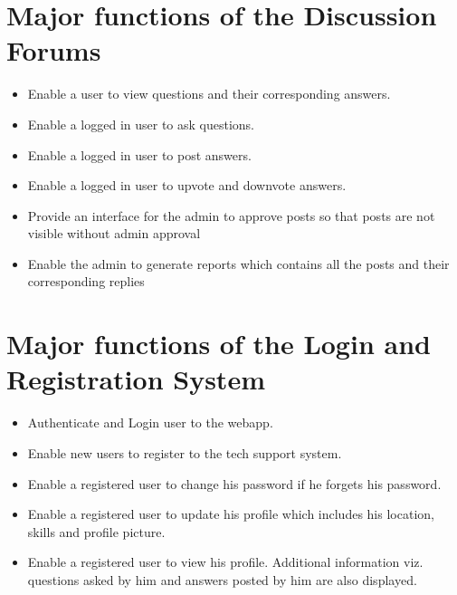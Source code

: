 \documentclass[letterpaper,10pt,english]{sphinxmanual}
\begin{document}
\section{Major functions of the Discussion Forums}
\label{unifieddoc:major-functions-of-the-discussion-forums}\begin{itemize}
\item {} 
Enable a user to view questions and their corresponding answers.

\item {} 
Enable a logged in user to ask questions.

\item {} 
Enable a logged in user to post answers.

\item {} 
Enable a logged in user to upvote and downvote answers.

\item {} 
Provide an interface for the admin to approve posts so that posts are not visible without admin approval

\item {} 
Enable the admin to generate reports which contains all the posts and their corresponding replies

\end{itemize}


\section{Major functions of the Login and Registration System}
\label{unifieddoc:major-functions-of-the-login-and-registration-system}\begin{itemize}
\item {} 
Authenticate and Login user to the webapp.

\item {} 
Enable new users to register to the tech support system.

\item {} 
Enable a registered user to change his password if he forgets his password.

\item {} 
Enable a registered user to update his profile which includes his location, skills and profile picture.

\item {} 
Enable a registered user to view his profile. Additional information viz. questions asked by him and answers posted by him are also displayed.

\end{itemize}
\end{document}

